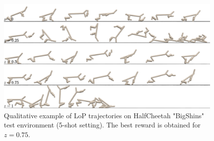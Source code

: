 
\newpage

\begin{figure}[t]
        \begin{center}
        \includegraphics[width=1.\linewidth]{images/bigshin.png}
        \caption{Qualitative example of LoP trajectories on HalfCheetah "BigShins" test environment (5-shot setting). The best reward is obtained for $z=0.75$.}
        \label{fig:bigshin}
        \end{center}
\end{figure}

